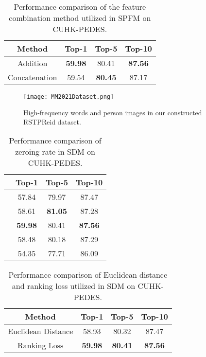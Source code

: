 \documentclass[sigconf]{acmart}
\begin{document}
\begin{table}
	\caption{Performance comparison of the feature combination method utilized in SPFM on CUHK-PEDES.}
	\label{tab:catadd}
	\begin{tabular}{c|ccc}
		\toprule
		Method & Top-1 & Top-5 & Top-10 \\
		\midrule
		Addition & \textbf{59.98} & 80.41 & \textbf{87.56} \\
		Concatenation & 59.54 & \textbf{80.45} & 87.17 \\
		\bottomrule
	\end{tabular}
\end{table}

\begin{figure}[h]
	\centering
	\texttt{[image: MM2021Dataset.png]}
	\caption{High-frequency words and person images in our constructed RSTPReid dataset.}
	\label{fig:rstpreid}
\end{figure}

\begin{table}
	\caption{Performance comparison of zeroing rate  in SDM on CUHK-PEDES.}
	\label{tab:DRSDM}
	\begin{tabular}{c|ccc}
		\toprule
		 & Top-1 & Top-5 & Top-10 \\
		\midrule
		 & 57.84 & 79.97 & 87.47 \\
		 & 58.61 & \textbf{81.05 }& 87.28 \\
		 & \textbf{59.98} & 80.41 & \textbf{87.56} \\
		 & 58.48 & 80.18 & 87.29 \\
		 & 54.35 & 77.71 & 86.09 \\
		\bottomrule
	\end{tabular}
\end{table}

\begin{table}
	\caption{Performance comparison of Euclidean distance and ranking loss utilized in SDM on CUHK-PEDES.}
	\label{tab:msesdm}
	\begin{tabular}{c|ccc}
		\toprule
		Method & Top-1 & Top-5 & Top-10 \\
		\midrule
		Euclidean Distance & 58.93 & 80.32 & 87.47 \\
		Ranking Loss & \textbf{59.98} & \textbf{80.41} & \textbf{87.56} \\
		\bottomrule
	\end{tabular}
\end{table}
\end{document}
